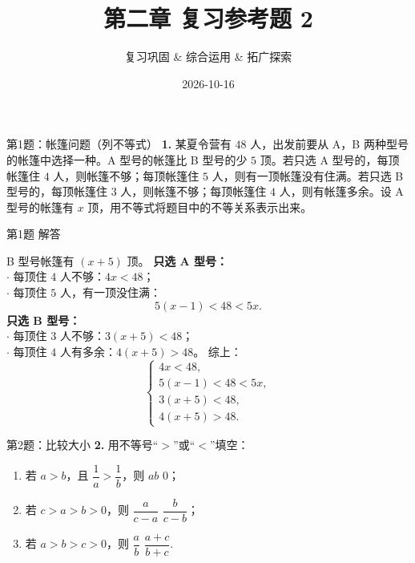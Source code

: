 \documentclass[10pt,aspectratio=169,serif]{beamer}
\title[复习参考题 2]{第二章 复习参考题 2}
\subtitle{复习巩固 \& 综合运用 \& 拓广探索}
\author{}
\institute{}
\date{2026-10-16}
\begin{document}
\begin{frame}
  \titlepage
\end{frame}

\begin{frame}[t]{第1题：帐篷问题（列不等式）}
\textbf{1.} 某夏令营有 $48$ 人，出发前要从 A，B 两种型号的帐篷中选择一种。A 型号的帐篷比 B 型号的少 $5$ 顶。若只选 A 型号的，每顶帐篷住 $4$ 人，则帐篷不够；每顶帐篷住 $5$ 人，则有一顶帐篷没有住满。若只选 B 型号的，每顶帐篷住 $3$ 人，则帐篷不够；每顶帐篷住 $4$ 人，则有帐篷多余。设 A 型号的帐篷有 $x$ 顶，用不等式将题目中的不等关系表示出来。
\end{frame}

\begin{frame}[t]{第1题 解答}
\begin{tcolorbox}[colback=orange!10,colframe=orange,title=\textbf{解}]
B 型号帐篷有 $(x+5)$ 顶。
\vspace{0.3em}
\textbf{只选 A 型号：}\\
$\cdot$ 每顶住 $4$ 人不够：$4x<48$；\\
$\cdot$ 每顶住 $5$ 人，有一顶没住满：
\[
5(x-1)<48<5x.
\]
\textbf{只选 B 型号：}\\
$\cdot$ 每顶住 $3$ 人不够：$3(x+5)<48$；\\
$\cdot$ 每顶住 $4$ 人有多余：$4(x+5)>48$。
\vspace{0.5em}
综上：
\[
\begin{cases}
4x<48,\\
5(x-1)<48<5x,\\
3(x+5)<48,\\
4(x+5)>48.
\end{cases}
\]
\end{tcolorbox}
\end{frame}

\begin{frame}[t]{第2题：比较大小}
\textbf{2.} 用不等号“$>$”或“$<$”填空：
\begin{enumerate}
  \item 若 $a>b$，且 $\dfrac{1}{a}>\dfrac{1}{b}$，则 $ab$ \underline{\hspace{1.5em}} $0$；
  \item 若 $c>a>b>0$，则 $\dfrac{a}{c-a}$ \underline{\hspace{1.5em}} $\dfrac{b}{c-b}$；
  \item 若 $a>b>c>0$，则 $\dfrac{a}{b}$ \underline{\hspace{1.5em}} $\dfrac{a+c}{b+c}$.
\end{enumerate}
\end{frame}
\end{document}
